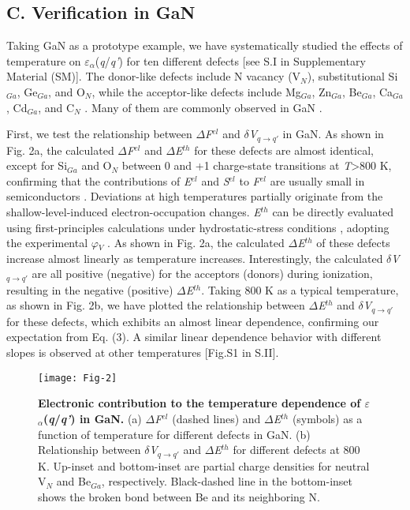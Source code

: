 \documentclass[onecolumn,preprint,superscriptaddress]{revtex4-1}
\begin{document}
\subsection*{C. Verification in GaN}
Taking GaN as a prototype example, we have systematically studied the effects of temperature on $\varepsilon$$_{\alpha}$(\emph{q}/\emph{q'}) for ten different defects [see S.I in Supplementary Material (SM)]. The donor-like defects include N vacancy (V$_N$), substitutional Si$_{Ga}$, Ge$_{Ga}$, and O$_N$, while the acceptor-like defects include Mg$_{Ga}$, Zn$_{Ga}$, Be$_{Ga}$, Ca$_{Ga}$, Cd$_{Ga}$, and C$_N$ \cite{39,40}. Many of them are commonly observed in GaN \cite{39,40}.

First, we test the relationship between $\Delta$\emph{F}$^{el}$ and $\delta$\emph{V}$_{q\rightarrow q'}$ in GaN. As shown in Fig. 2a, the calculated $\Delta$\emph{F}$^{el}$ and $\Delta$\emph{E}$^{th}$ for these defects are almost identical, except for Si$_{Ga}$ and O$_{N}$ between 0 and +1 charge-state transitions at \emph{T}>800 K, confirming that the contributions of \emph{E}$^{el}$ and \emph{S}$^{el}$ to \emph{F}$^{el}$ are usually small in semiconductors \cite{12,31}. Deviations at high temperatures partially originate from the shallow-level-induced electron-occupation changes. \emph{E}$^{th}$ can be directly evaluated using first-principles calculations under hydrostatic-stress conditions \cite{42,43}, adopting the experimental $\varphi$$_{V}$ \cite{44}. As shown in Fig. 2a, the calculated $\Delta$\emph{E}$^{th}$ of these defects increase almost linearly as temperature increases. Interestingly, the calculated $\delta$\emph{V}$_{q\rightarrow q'}$ are all positive (negative) for the acceptors (donors) during ionization, resulting in the negative (positive) $\Delta$\emph{E}$^{th}$. Taking 800 K as a typical temperature, as shown in Fig. 2b, we have plotted the relationship between $\Delta$\emph{E}$^{th}$ and $\delta$\emph{V}$_{q\rightarrow q'}$ for these defects, which exhibits an almost linear dependence, confirming our expectation from Eq. (3). A similar linear dependence behavior with different slopes is observed at other temperatures [Fig.S1 in S.II].

\begin{figure}[htb!]
\texttt{[image: Fig-2]}
\caption{\label{fig:structure} \textbf{Electronic contribution to the temperature dependence of $\varepsilon$$_{\alpha}$(\emph{q}/\emph{q'}) in GaN.}
(a) $\Delta$\emph{F}$^{el}$ (dashed lines) and $\Delta$\emph{E}$^{th}$ (symbols) as a function of temperature for different defects in GaN. (b) Relationship between $\delta$\emph{V}$_{q\rightarrow q'}$ and $\Delta$\emph{E}$^{th}$ for different defects at 800 K. Up-inset and bottom-inset are partial charge densities for neutral V$_N$ and Be$_{Ga}$, respectively. Black-dashed line in the bottom-inset shows the broken bond between Be and its neighboring N.}
\label{2}
\end{figure}
\end{document}

